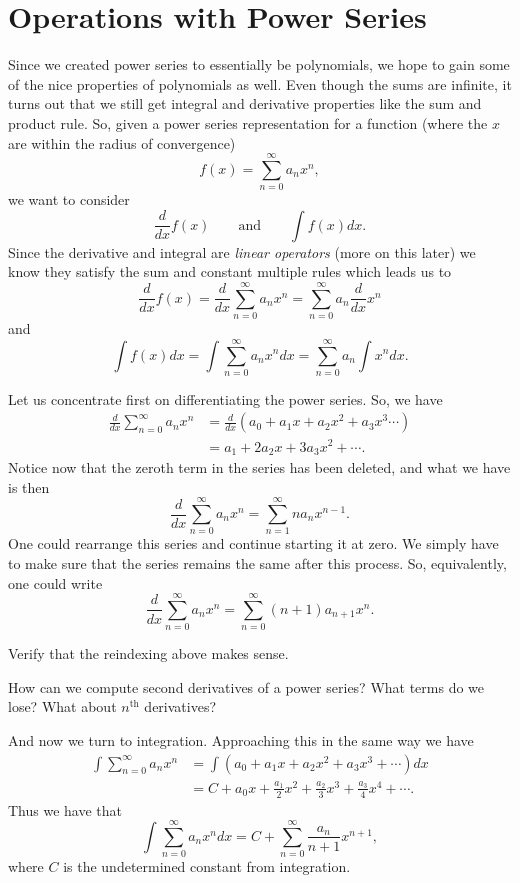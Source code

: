 \section{Operations with Power Series}
Since we created power series to essentially be polynomials, we hope to gain some of the nice properties of polynomials as well.  Even though the sums are infinite, it turns out that we still get integral and derivative properties like the sum and product rule.  So, given a power series representation for a function (where the $x$ are within the radius of convergence)
\[
f(x)=\sum_{n=0}^\infty a_n x^n,
\]
we want to consider
\[
\frac{d}{dx} f(x) \qquad \textrm{and} \qquad \int f(x) dx.
\]
Since the derivative and integral are \emph{linear operators} (more on this later) we know they satisfy the sum and constant multiple rules which leads us to
\[
\frac{d}{dx} f(x) = \frac{d}{dx} \sum_{n=0}^\infty a_n x^n = \sum_{n=0}^\infty a_n \frac{d}{dx} x^n
\]
and
\[
\int f(x) dx = \int \sum_{n=0}^\infty a_nx^n dx = \sum_{n=0}^\infty a_n \int x^n dx.
\]

Let us concentrate first on differentiating the power series.  So, we have
\begin{align*}
\frac{d}{dx} \sum_{n=0}^\infty a_nx^n&=\frac{d}{dx} \left(a_0 + a_1x + a_2 x^2 + a_3 x^3 \cdots\right)\\
&= a_1 + 2a_2x+3a_3x^2+\cdots.
\end{align*}
Notice now that the zeroth term in the series has been deleted, and what we have is then
\[
\boxed{\frac{d}{dx} \sum_{n=0}^\infty a_n x^n = \sum_{n=1}^\infty na_n x^{n-1}.}
\]
One could rearrange this series and continue starting it at zero.  We simply have to make sure that the series remains the same after this process.  So, equivalently, one could write
\[
\frac{d}{dx} \sum_{n=0}^\infty a_n x^n = \sum_{n=0}^\infty (n+1)a_{n+1} x^n.
\]

\begin{exercise}
    Verify that the reindexing above makes sense.
\end{exercise}

\begin{exercise}
    How can we compute second derivatives of a power series? What terms do we lose? What about $n^\textrm{th}$ derivatives?
\end{exercise}

And now we turn to integration. Approaching this in the same way we have
\begin{align*}
    \int \sum_{n=0}^\infty a_n x^n &= \int \left( a_0 +a_1x+a_2x^2+a_3x^3+\cdots\right)dx\\
    &= C+a_0x+\frac{a_1}{2}x^2+\frac{a_2}{3}x^3+\frac{a_3}{4}x^4+\cdots.
\end{align*}
Thus we have that
\[
\boxed{\int \sum_{n=0}^\infty a_n x^n dx = C + \sum_{n=0}^\infty \frac{a_n}{n+1} x^{n+1},}
\]
where $C$ is the undetermined constant from integration.

